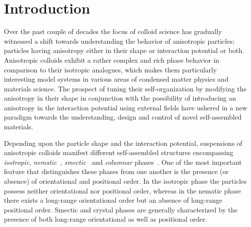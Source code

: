 \documentclass[aps,prl,preprint,superscriptaddress,showkeys]{revtex4-2} %
\begin{document}
\section{Introduction}
Over the past couple of decades the focus of colloid science has gradually witnessed a shift towards understanding the behavior of anisotropic particles; particles having anisotropy either in their shape or interaction potential or both. Anisotropic colloids exhibit a rather complex and rich phase behavior in comparison to their isotropic analogues, which makes them particularly interesting model systems in various areas of condensed matter physics and materials science. The prospect of tuning their self-organization by modifying the anisotropy in their shape in conjunction with the possibility of introducing an anisotropy in the interaction potential using external fields have ushered in a new paradigm towards the understanding, design and control of novel self-assembled materials. \par
Depending upon the particle shape and the interaction potential, suspensions of aniso\-tropic colloids manifest different self-assembled structures encompassing \emph{isotropic}, \emph{nematic}~\cite{pizzey2004suspensions, van1998formation, purdy2005nematic, buining1993isotropic, fraden1989isotropic, lemaire2002outstanding, lemaire2004physical, vroege2014biaxial, van2010uniaxial, rossi2010cholesteric, li2016colloidal,dogic2016filamentous}, \emph{smectic}~\cite{davidson2018isotropic, vroege2006smectic, kuijk2012phase} and \emph{columnar} phases~\cite{van2000liquid, brown1999phase, wijnhoven2005sedimentation, van2004liquid, van2005evidence}. One of the most important feature that distinguishes these phases from one another is the presence (or absence) of orientational and positional order. In the isotropic phase the particles possess neither orientational nor positional order, whereas in the nematic phase there exists a long-range orientational order but an absence of long-range positional order. Smectic and crystal phases are generally characterized by the presence of both long-range orientational as well as positional order. \par
\end{document}
